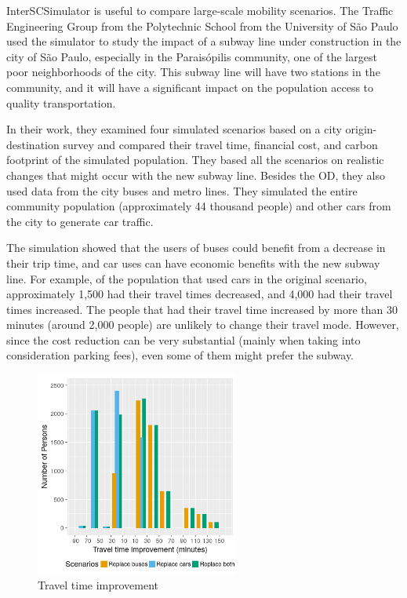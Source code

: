 InterSCSimulator is useful to compare large-scale mobility scenarios. The Traffic Engineering Group from the Polytechnic School from the University of S\~ao Paulo used the simulator to study the impact of a subway line under construction in the city of S\~ao Paulo, especially in the Paraisópilis community, one of the largest poor neighborhoods of the city. This subway line will have two stations in the community, and it will have a significant impact on the population access to quality transportation.

In their work, they examined four simulated scenarios based on a city origin-destination survey and compared their travel time, financial cost, and carbon footprint of the simulated population. They based all the scenarios on realistic changes that might occur with the new subway line. Besides the OD, they also used data from the city buses and metro lines. They simulated the entire community population (approximately 44 thousand people) and other cars from the city to generate car traffic.

The simulation showed that the users of buses could benefit from a decrease in their trip time, and car uses can have economic benefits with the new subway line. For example, of the population that used cars in the original scenario, approximately 1,500 had their travel times decreased, and 4,000 had their travel times increased. The people that had their travel time increased by more than 30 minutes (around 2,000 people) are unlikely to change their travel mode. However, since the cost reduction can be very substantial (mainly when taking into consideration parking fees), even some of them might prefer the subway.

\begin{figure}[!htb]
\centering
\includegraphics[width=0.6\textwidth]{figuras/chap-uses/hist_travel_time.png}
\caption{Travel time improvement}
\label{fig:travel_time}
\end{figure}

